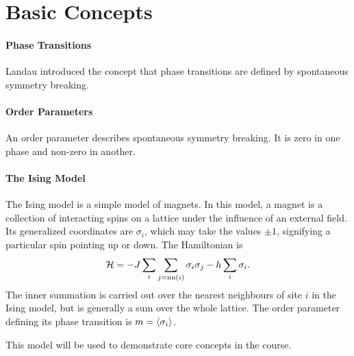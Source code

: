 \section{Basic Concepts}

\paragraph{Phase Transitions}
Landau introduced the concept that phase transitions are defined by spontaneous symmetry breaking.

\paragraph{Order Parameters}
An order parameter describes spontaneous symmetry breaking. It is zero in one phase and non-zero in another.

\paragraph{The Ising Model}
The Ising model is a simple model of magnets. In this model, a magnet is a collection of interacting spins on a lattice under the influence of an external field. Its generalized coordinates are $\sigma_{i}$, which may take the values $\pm 1$, signifying a particular spin pointing up or down. The Hamiltonian is
\begin{align*}
	\mathcal{H} = -J\sum\limits_{i}\sum\limits_{j = \text{nn}(i)}\sigma_{i}\sigma_{j} - h\sum\limits_{i}\sigma_{i}.
\end{align*}
The inner summation is carried out over the nearest neighbours of site $i$ in the Ising model, but is generally a sum over the whole lattice. The order parameter defining its phase transition is $m = \expval{\sigma_{i}}$.

This model will be used to demonstrate core concepts in the course.